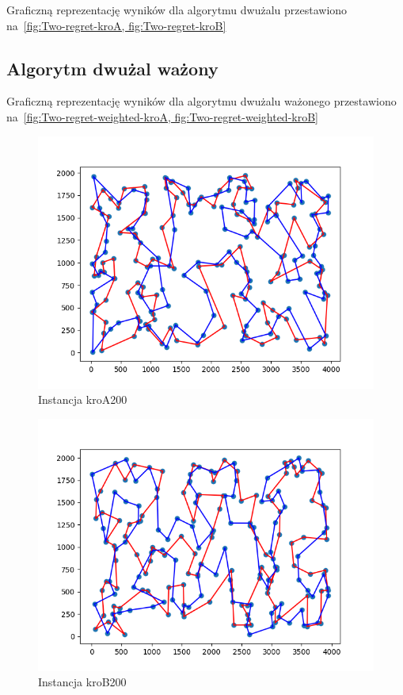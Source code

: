 \documentclass[11pt]{article}
\begin{document}
Graficzną reprezentację wyników dla algorytmu dwużalu przestawiono na~\ref{fig:Two-regret-kroA, fig:Two-regret-kroB}

\subsection{Algorytm dwużal ważony}\label{subsec:algorytm-dwużal-ważony}
Graficzną reprezentację wyników dla algorytmu dwużalu ważonego przestawiono na~\ref{fig:Two-regret-weighted-kroA, fig:Two-regret-weighted-kroB}
\begin{figure}[H]
    \centering
    \includegraphics{best_paths/weighted_two_regret_kroA200.tsp.png}
    \caption{Instancja kroA200}
    \label{fig:Two-regret-weighted-kroA}
\end{figure}
\begin{figure}[H]
    \centering
    \includegraphics{best_paths/weighted_two_regret_kroB200.tsp.png}
    \caption{Instancja kroB200}
    \label{fig:Two-regret-weighted-kroB}
\end{figure}
\end{document}
